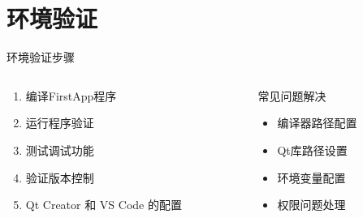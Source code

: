 \documentclass[UTF8,aspectratio=169]{beamer}
\begin{document}
\section{环境验证}

\begin{frame}{环境验证步骤}
    \begin{columns}
        \begin{column}{0.58\textwidth}
            \begin{enumerate}
                \item 编译FirstApp程序
                \item 运行程序验证
                \item 测试调试功能
                \item 验证版本控制
                \item Qt Creator 和 VS Code 的配置
            \end{enumerate}
        \end{column}
        \hspace{0.02\textwidth}
        \begin{column}{0.38\textwidth}
            \begin{ytublock}{常见问题解决}
                \begin{itemize}
                    \item 编译器路径配置
                    \item Qt库路径设置
                    \item 环境变量配置
                    \item 权限问题处理
                \end{itemize}
            \end{ytublock}
        \end{column}
    \end{columns}
\end{frame}
\end{document}
